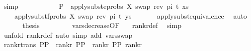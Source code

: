 \begin{isabellebody}
\ simp{\isacharplus}{\kern0pt}\isanewline
\ \ \isamarkupfalse%
\ \isamarkupfalse%
\ {}\ \isamarkupfalse%
\isanewline
\ \ \ \ {\isachardoublequoteopen}P{}\ {\isacharequal}{\kern0pt}\ {\isacharparenleft}{\kern0pt}apply{\isacharunderscore}{\kern0pt}subst{\isacharunderscore}{\kern0pt}eprobs\ {\isacharbrackleft}{\kern0pt}{\isacharparenleft}{\kern0pt}X{\isacharcomma}{\kern0pt}\ swap\ {\isacharparenleft}{\kern0pt}rev\ pi{\isacharparenright}{\kern0pt}\ t{\isacharparenright}{\kern0pt}{\isacharbrackright}{\kern0pt}\ xs{\isacharcomma}{\kern0pt}\ \isanewline
\ \ \ \ apply{\isacharunderscore}{\kern0pt}subst{\isacharunderscore}{\kern0pt}fprobs\ {\isacharbrackleft}{\kern0pt}{\isacharparenleft}{\kern0pt}X{\isacharcomma}{\kern0pt}\ swap\ {\isacharparenleft}{\kern0pt}rev\ pi{\isacharparenright}{\kern0pt}\ t{\isacharparenright}{\kern0pt}{\isacharbrackright}{\kern0pt}\ ys{\isacharparenright}{\kern0pt}{\isachardoublequoteclose}\isanewline
\ \ \ \ \ \isamarkupfalse%
\ apply{\isacharunderscore}{\kern0pt}subst{\isacharunderscore}{\kern0pt}equivalence\ \isamarkupfalse%
\ auto\isanewline
\ \ \ \isamarkupfalse%
\ \isamarkupfalse%
\ {\isacharquery}{\kern0pt}thesis\ \ \isanewline
\ \ \ \ \isamarkupfalse%
\ {}\ vars{\isacharunderscore}{\kern0pt}decrease{\isacharbrackleft}{\kern0pt}OF\ {}{\isacharparenleft}{\kern0pt}{}{\isacharparenright}{\kern0pt}{\isacharbrackright}{\kern0pt}\ \isamarkupfalse%
\ rank{\isacharunderscore}{\kern0pt}r{\isacharunderscore}{\kern0pt}def\ \isamarkupfalse%
\ simp\isanewline
{}\isamarkupfalse%
\ {\isacharparenleft}{\kern0pt}unfold\ rank{\isacharunderscore}{\kern0pt}r{\isacharunderscore}{\kern0pt}def{\isacharcomma}{\kern0pt}\ auto\ simp\ add{\isacharcolon}{\kern0pt}\ vars{\isacharunderscore}{\kern0pt}swap{\isacharparenright}{\kern0pt}%
\endisatagproof
{\isafoldproof}%
%
\isadelimproof
\isanewline
%
\endisadelimproof
\isanewline
{}\isamarkupfalse%
\ rank{\isacharunderscore}{\kern0pt}r{\isacharunderscore}{\kern0pt}trans{\isacharcolon}{\kern0pt}\ {\isachardoublequoteopen}{\isasymlbrakk}{\isacharparenleft}{\kern0pt}P{}{\isacharcomma}{\kern0pt}P{}{\isacharparenright}{\kern0pt}\ {\isasymin}\ rank{\isacharunderscore}{\kern0pt}r{\isacharsemicolon}{\kern0pt}\ {\isacharparenleft}{\kern0pt}P{}{\isacharcomma}{\kern0pt}P{}{\isacharparenright}{\kern0pt}\ {\isasymin}\ rank{\isacharunderscore}{\kern0pt}r{\isasymrbrakk}{\isasymLongrightarrow}\ {\isacharparenleft}{\kern0pt}P{}{\isacharcomma}{\kern0pt}P{}{\isacharparenright}{\kern0pt}{\isasymin}\ rank{\isacharunderscore}{\kern0pt}r{\isachardoublequoteclose}\isanewline

\end{isabellebody}
